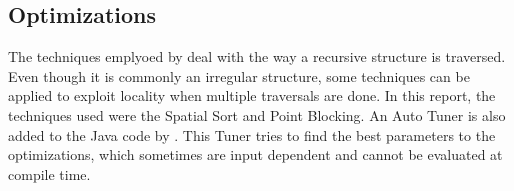 \subsection{Optimizations}
\label{sec:optim}

The techniques emplyoed by \treetiler deal with the way a recursive structure is traversed. Even though it is commonly an irregular structure, some techniques can be applied to exploit locality when multiple traversals are done. In this report, the techniques used were the Spatial Sort and Point Blocking. An Auto Tuner is also added to the Java code by \treetiler. This Tuner tries to find the best parameters to the optimizations, which sometimes are input dependent and cannot be evaluated at compile time.



